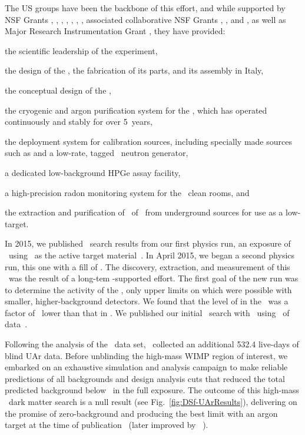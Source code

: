 The US groups have been the backbone of this effort, and while supported by NSF Grants , , , , , , , associated collaborative NSF Grants , ,  and , as well as Major Research Instrumentation Grant , they have provided:
\begin{compactitem}
\item the scientific leadership of the experiment,
\item the design of the \LArTPC, the fabrication of its parts, and its assembly in Italy,
\item the conceptual design of the \LSV,
\item the cryogenic and argon purification system for the \TPC, which has operated continuously and stably for over 5~years,
\item the deployment system for calibration sources, including specially made sources such as  and a low-rate, tagged \DD\ neutron generator,
\item a dedicated low-background HPGe assay facility, 
\item a high-precision radon monitoring system for the \DSs\ clean rooms, and
\item the extraction and purification of \DSfUArMassDelivered\ of \UAr\ from underground sources for use as a low- target.
\end{compactitem}

In 2015, we published \WIMP\ search results from our first physics run, an exposure of \DSfAArLiveDay\ using  \AAr\ as the active target material~\cite{Agnes:2015gu}.  In April 2015, we began a second physics run, this one with a fill of \UAr.  The discovery, extraction, and measurement of this \UAr\ was the result of a long-tem \NSF-supported effort.  The first goal of the new run was to determine the activity of the \UAr, only upper limits on which were possible with smaller, higher-background detectors.  We found that the level of  in the \UAr\ was a factor of \DSfAAronUArratio\ lower than that in \AAr.  We published our initial \WIMP\ search with \UAr\ using \DSfUArLiveDay\ of data~\cite{Agnes:2016fz}.

Following the analysis of the \DSfUArLiveDay\ data set, \DSfs\ collected an additional 532.4 live-days of blind UAr data. Before unblinding the high-mass WIMP region of interest, we embarked on an exhaustive simulation and analysis campaign to make reliable predictions of all backgrounds and design analysis cuts that reduced the total predicted background below \BackgroundFreeRequirement\ in the full exposure.  The outcome of this high-mass \WIMP\ dark matter search is a null result (see Fig.~\ref{fig:DSf-UArResults}), delivering on the promise of zero-background and producing the best limit with an argon target at the time of publication~\cite{Agnes:2018ep} (later improved by \DEAP~\cite{Amaudruz:2018gr}).

